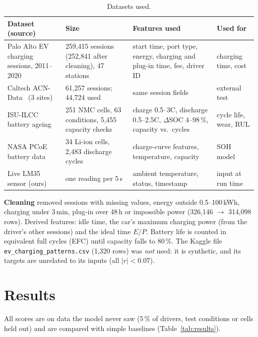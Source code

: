 \documentclass[11pt,a4paper]{article}
\begin{document}
\begin{table}[!ht]
\centering\footnotesize
\caption{Datasets used.}
\label{tab:data}
\begin{tabularx}{\textwidth}{@{}L{4.4cm}L{4.4cm}YL{2.3cm}@{}}
  \toprule
  \textbf{Dataset (source)} & \textbf{Size} & \textbf{Features used} & \textbf{Used for} \\
  \midrule
  Palo Alto EV charging sessions, 2011--2020~\cite{pa} & 259{,}415 sessions (252{,}841 after cleaning),
      47 stations & start time, port type, energy, charging and plug-in time, fee, driver ID & charging time, cost \\
  Caltech ACN-Data~\cite{acn} (3 sites) & 61{,}257 sessions; 44{,}724 used & same session fields & external test \\
  ISU-ILCC battery ageing~\cite{isu} & 251 NMC cells, 63 conditions, 5{,}455 capacity checks & charge 0.5--3C,
      discharge 0.5--2.5C, $\Delta$SOC 4--98\,\%, capacity vs.\ cycles & cycle life, wear, RUL \\
  NASA PCoE battery data~\cite{nasa} & 34 Li-ion cells, 2{,}483 discharge cycles & charge-curve features,
      temperature, capacity & SOH model \\
  Live LM35 sensor (ours) & one reading per 5\,s & ambient temperature, status, timestamp & input at run time \\
  \bottomrule
\end{tabularx}
\end{table}

\textbf{Cleaning} removed sessions with missing values, energy outside 0.5--100\,kWh, charging under 3\,min, plug-in
over 48\,h or impossible power (326{,}146 $\rightarrow$ 314{,}098 rows). Derived features: idle time, the car's
maximum charging power (from the driver's other sessions) and the ideal time $E/P$. Battery life is counted in
equivalent full cycles (EFC) until capacity falls to 80\,\%. The Kaggle file \texttt{ev\_charging\_patterns.csv}
(1{,}320 rows) was \emph{not} used: it is synthetic, and its targets are unrelated to its inputs (all $|r|<0.07$).

\section{Results}
All scores are on data the model never saw (5\,\% of drivers, test conditions or cells held out) and are compared
with simple baselines (Table~\ref{tab:results}).
\end{document}
